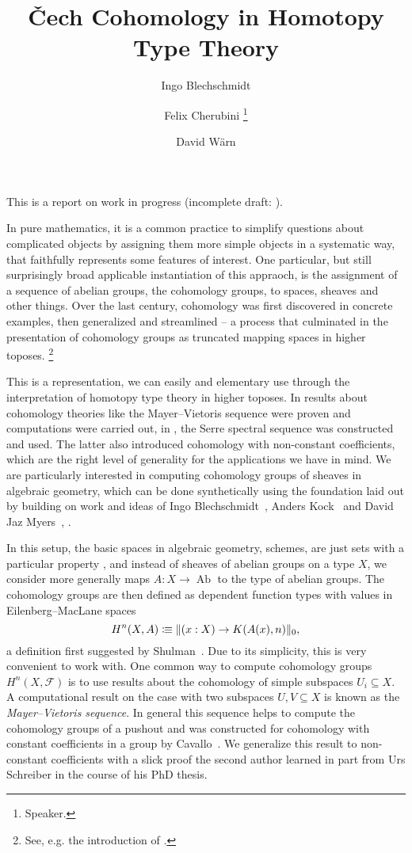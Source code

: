 \documentclass[letterpaper]{../util/easychair}
\title{\v{C}ech Cohomology in Homotopy Type Theory
}
\author{
Ingo Blechschmidt \inst{1}
\and 
 Felix Cherubini \inst{2}%
 \thanks{Speaker.}%
\and 
 David Wärn \inst{3}
}
\institute{
  \email{iblech@speicherleck.de}
\and
  University of Gothenburg\\
  \email{felix.cherubini@posteo.de}
\and
  University of Gothenburg\\
  \email{warnd@chalmers.se}
}
\DeclareMathOperator{\AbGroup}{Ab}
\newcommand{\notion}[1]{\emph{#1}\index{#1}}
\providecommand*\colonequiv{\vcentcolon\mspace{-1.2mu}\equiv}
\begin{document}
\maketitle

This is a report on work in progress (incomplete draft: \cite{chech-draft}).

In pure mathematics,
it is a common practice to simplify questions about complicated objects
by assigning them more simple objects in a systematic way,
that faithfully represents some features of interest.
One particular, but still surprisingly broad applicable instantiation of this appraoch,
is the assignment of a sequence of abelian groups, the cohomology groups, to spaces, sheaves and other things.
Over the last century, cohomology was first discovered in concrete examples, then generalized and streamlined --
a process that culminated in the presentation of cohomology groups as truncated mapping spaces in higher toposes.%
\footnote{See, e.g. the introduction of \cite{lurie-htt}.}

This is a representation, we can easily and elementary use through the interpretation of homotopy type theory in higher toposes.
In \cite{evan-master-thesis} results about cohomology theories like the Mayer--Vietoris sequence were proven and computations were carried out,
in \cite{floris-thesis}, the Serre spectral sequence was constructed and used.
The latter also introduced cohomology with non-constant coefficients,
which are the right level of generality for the applications we have in mind.
We are particularly interested in computing cohomology groups of sheaves in algebraic geometry,
which can be done synthetically using the foundation laid out by \cite{draft}
building on work and ideas of Ingo Blechschmidt~\cite{ingo-thesis}, Anders Kock~\cite{kock-sdg}
and David Jaz Myers~\cite{myers-talk1}, \cite{myers-talk2}.

In this setup, the basic spaces in algebraic geometry, schemes,
are just sets with a particular property \cite[Definition~4.3.1]{draft},
and instead of sheaves of abelian groups on a type $X$,
we consider more generally maps $A:X\to\AbGroup$ to the type of abelian groups.
The cohomology groups are then defined as dependent function types with values in Eilenberg--MacLane spaces
\[ H^n(X,A)\colonequiv \|(x:X)\to K(A(x),n)\|_0,\]
a definition first suggested by Shulman~\cite{mike-blogpost}.
Due to its simplicity, this is very convenient to work with.
One common way to compute cohomology groups $H^n(X,\mathcal F)$ is to
use results about the cohomology of simple subspaces $U_i\subseteq X$.
A computational result on the case with two subspaces $U,V\subseteq X$ is known as the \notion{Mayer--Vietoris sequence}.
In general this sequence helps to compute the cohomology groups of a pushout
and was constructed for cohomology with constant coefficients in a group by Cavallo~\cite{evan-master-thesis}.
We generalize this result to non-constant coefficients
with a slick proof the second author learned in part from Urs Schreiber in the course of his PhD thesis.
\end{document}
